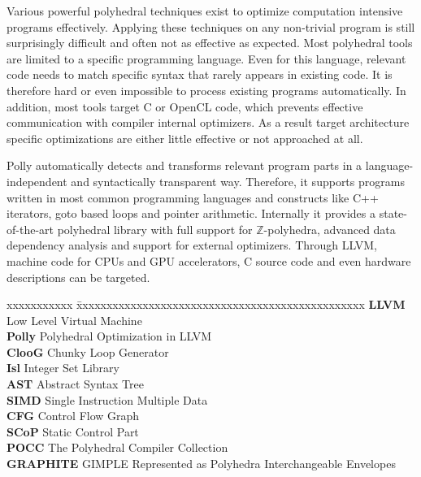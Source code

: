 \documentclass[MTech]{iitmdiss}
\begin{document}
Various powerful polyhedral techniques exist to optimize
computation intensive programs effectively.  Applying these techniques on any
non-trivial
program is still surprisingly difficult and often not as effective as expected.
Most polyhedral tools are limited to a specific programming language.  Even for
this language, relevant code needs to match specific syntax that rarely
appears in existing code.  It is therefore hard or even impossible to
process existing programs automatically.  In addition, most tools target C or
OpenCL code, which prevents effective communication with compiler internal
optimizers. As a result target architecture specific optimizations are
either little effective or not approached at all.

 Polly automatically detects and transforms relevant program parts in a
language-independent and syntactically transparent way. Therefore, it supports
programs written in most common programming languages and constructs
like C++ iterators, goto based loops and pointer arithmetic.  Internally it
provides a state-of-the-art polyhedral library with full support for
$\mathbb{Z}$-polyhedra, advanced data dependency analysis and
support for external optimizers. Through LLVM, machine code for CPUs and GPU accelerators,
C source code and even hardware descriptions can be targeted.


\pagebreak


\begin{singlespace}
\tableofcontents
\thispagestyle{empty}

\listoffigures
{}
\end{singlespace}


\abbreviations
 
\noindent 
\begin{tabbing}
xxxxxxxxxxx \= xxxxxxxxxxxxxxxxxxxxxxxxxxxxxxxxxxxxxxxxxxxxxxxx \kill
\textbf{LLVM}   \> Low Level Virtual Machine \\
\textbf{Polly} \> Polyhedral Optimization in LLVM \\
\textbf{ClooG} \>  Chunky Loop Generator \\
\textbf{Isl} \>  Integer Set Library \\
\textbf{AST} \>  Abstract Syntax Tree \\
\textbf{SIMD} \> Single Instruction Multiple Data  \\
\textbf{CFG} \>  Control Flow Graph  \\
\textbf{SCoP} \> Static Control Part  \\
\textbf{POCC} \> The Polyhedral Compiler Collection  \\
\textbf{GRAPHITE} \> GIMPLE Represented as Polyhedra Interchangeable Envelopes   \\
\textbf{} \>   \\
\end{tabbing}
\end{document}
